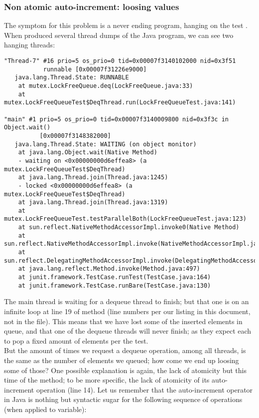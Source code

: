 \subsubsection{Non atomic auto-increment: loosing values}

The symptom for this problem is a never ending program, hanging on the
test . When produced several thread dumps of the
Java program, we can see two hanging threads: \\

\begin{verbatim}
"Thread-7" #16 prio=5 os_prio=0 tid=0x00007f3140102000 nid=0x3f51
           runnable [0x00007f31226e9000]
   java.lang.Thread.State: RUNNABLE
	at mutex.LockFreeQueue.deq(LockFreeQueue.java:33)
	at mutex.LockFreeQueueTest$DeqThread.run(LockFreeQueueTest.java:141)

"main" #1 prio=5 os_prio=0 tid=0x00007f3140009800 nid=0x3f3c in Object.wait() 
          [0x00007f3148382000]
   java.lang.Thread.State: WAITING (on object monitor)
	at java.lang.Object.wait(Native Method)
	- waiting on <0x00000000d6effea8> (a mutex.LockFreeQueueTest$DeqThread)
	at java.lang.Thread.join(Thread.java:1245)
	- locked <0x00000000d6effea8> (a mutex.LockFreeQueueTest$DeqThread)
	at java.lang.Thread.join(Thread.java:1319)
	at mutex.LockFreeQueueTest.testParallelBoth(LockFreeQueueTest.java:123)
	at sun.reflect.NativeMethodAccessorImpl.invoke0(Native Method)
	at sun.reflect.NativeMethodAccessorImpl.invoke(NativeMethodAccessorImpl.java:62)
	at sun.reflect.DelegatingMethodAccessorImpl.invoke(DelegatingMethodAccessorImpl.java:43)
	at java.lang.reflect.Method.invoke(Method.java:497)
	at junit.framework.TestCase.runTest(TestCase.java:164)
	at junit.framework.TestCase.runBare(TestCase.java:130)
\end{verbatim}
\hfill

The main thread is waiting for a dequeue thread to finish; but that
one is on an infinite loop at line 19 of  method (line numbers
per our listing in this document, not in the file). This means that we
have lost some of the inserted elements in queue, and that one of the
dequeue threads will never finish; as they expect each to pop a fixed
amount of elements per the test. \\

But the amount of times we request a dequeue operation, among all
threads, is the same as the number of elements we queued; how come we
end up loosing some of those? One possible explanation is again, the
lack of atomicity but this time of the  method; to be more
specific, the lack of atomicity of its auto-increment operation 
 (line 14). Let us remember that the auto-increment
operator in Java is nothing but syntactic sugar for the following
sequence of operations (when applied to  variable): \\


